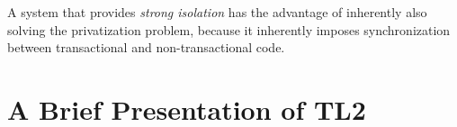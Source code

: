A system that provides {\it strong isolation} has the advantage of
inherently also solving the privatization problem, because it inherently 
imposes synchronization between transactional and non-transactional code.


\section{A Brief Presentation of TL2}
\label{sec:tl2}



